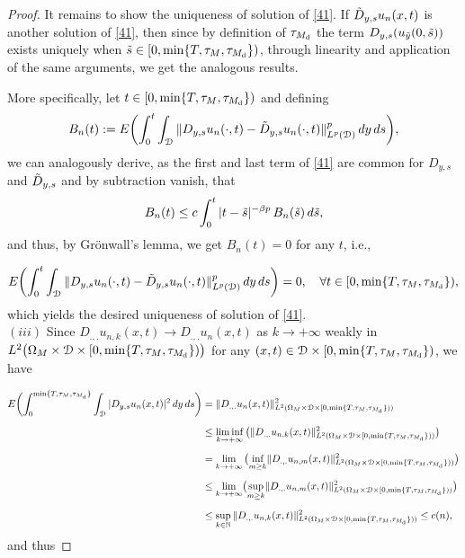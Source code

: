 \documentclass[reqno]{amsart}
\numberwithin{equation}{section}
\newcommand{\mN}{\mathbb{N}}
\newcommand{\Om}{\Omega}
\newcommand{\cd}{\mathcal{D}}
\begin{document}
\begin{proof}
It remains to show the uniqueness of solution of \eqref{41}. If $\Tilde{D}_{y,s}u_{n}(x,t)$ is another solution of \eqref{41}, then since by definition of $\tau_{M_{\rm d}}$ the term $D_{y,s}(u_{\Tilde{y}}(0,\Tilde{s}))$ exists uniquely when $\Tilde{s}\in[0,\min\{T,\tau_M,\tau_{M_{\rm d}}\})$, through linearity and application of the same arguments, we get the analogous results.

More specifically, let $t\in [0,\min\{T,\tau_M,\tau_{M_{\rm d}}\})$ and defining
\begin{align*}
B_n(t) := E\biggl(\int_0^t\int_{\cd}\|D_{y,s}u_n(\cdot,t)-\Tilde{D}_{y,s}u_n(\cdot,t)\|^p_{L^p(\cd)}\,dy\,ds\biggr) ,
\end{align*}
we can analogously derive, as the first and last term of
\eqref{41} are common for $D_{y,s}$ and $\Tilde{D}_{y,s}$ and by
subtraction vanish, that
\begin{align*}
B_n(t)\leq c\int_0^t |t-\Tilde{s}|^{-\beta p} \, B_n(\Tilde{s})\, d\Tilde{s} ,
\end{align*}
and thus, by Gr\"onwall's lemma, we get $B_n(t)=0$ for any $t$, i.e.,

\begin{align*}
E\biggl(\int_0^t\int_{\cd}\|D_{y,s}u_n(\cdot,t)-\Tilde{D}_{y,s}u_n(\cdot,t)\|^p_{L^p(\cd)}\,dy\,ds\biggr)=0,\quad \forall t\in[0,\min\{T,\tau_M,\tau_{M_{\rm d}}\}) ,
\end{align*}
which yields the desired uniqueness of solution of \eqref{41}.
\\[0.5cm]
$(iii)$ Since $D_{.,.}u_{n,k}(x,t)\rightarrow D_{.,.}u_n(x,t)$
as $k\rightarrow+\infty$ weakly in
$L^2\bigl{(}\Om_M\times\cd\times[0,\min\{T,\tau_M,\tau_{M_{\rm d}}\})\bigr{)}$ for any
$(x,t)\in\cd\times[0,\min\{T,\tau_M,\tau_{M_{\rm d}}\})$, we have

\allowdisplaybreaks
\begin{align*}
E\biggl{(}\int_0^{\min\{T,\tau_M,\tau_{M_{\rm d}}\}}\int_{\cd}|D_{y,s}u_n(x,t)|^2\,dy\,ds\biggr{)}&= \|D_{.,.}u_n(x,t)\|^2_{L^2(\Om_M\times\cd\times[0,\min\{T,\tau_M,\tau_{M_{\rm d}}\}))}
\\[0.2cm]
&\leq \liminf_{k\rightarrow+\infty} \big(\|D_{.,.}u_{n,k}(x,t)\|^2_{L^2(\Om_M\times\cd\times[0,\min\{T,\tau_M,\tau_{M_{\rm d}}\}))}\big)
\\[0.2cm]
&=\lim_{k\rightarrow+\infty} \big(\underset{m\geq k}{\text{inf}}\|D_{.,.}u_{n,m}(x,t)\|^2_{L^2(\Om_M\times\cd\times[0,\min\{T,\tau_M,\tau_{M_{\rm d}}\}))}\big)
\\[0.2cm]
&\leq \underset{k\rightarrow+\infty}{\text{lim}}\big(\underset{m\geq k}{\text{sup}}\|D_{.,.}u_{n,m}(x,t)\|^2_{L^2
(\Om_M\times\cd\times[0,\min\{T,\tau_M,\tau_{M_{\rm d}}\}))}\big)
\\[0.2cm]
&\leq \sup_{k\in\mN} \|D_{.,.}u_{n,k}(x,t)\|^2_{L^2(\Om_M\times\cd\times[0,\min\{T,\tau_M,\tau_{M_{\rm d}}\}))}\leq c(n),
\end{align*}
and thus


\end{proof}
\end{document}
